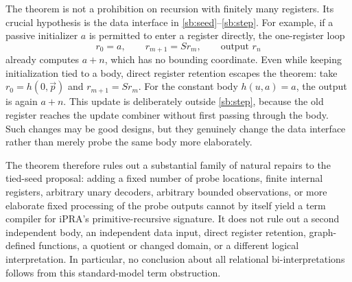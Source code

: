 The theorem is not a prohibition on recursion with finitely many
registers.  Its crucial hypothesis is the data interface in
\eqref{sb:seed}--\eqref{sb:step}.  For example, if a passive initializer
$a$ is permitted to enter a register directly, the one-register loop
\[
             r_0=a,\qquad r_{m+1}=Sr_m,
             \qquad\text{output }r_n
\]
already computes $a+n$, which has no bounding coordinate.  Even while keeping initialization tied to a body, direct register
retention escapes the theorem: take $r_0=h(0,\vec p)$ and
$r_{m+1}=Sr_m$.  For the constant body $h(u,a)=a$, the output is again
$a+n$.  This update is deliberately outside \eqref{sb:step}, because
the old register reaches the update combiner without first passing
through the body.  Such changes may be good designs, but they genuinely
change the data interface rather than merely probe the same body more
elaborately.

The theorem therefore rules out a substantial family of natural repairs
to the tied-seed proposal: adding a fixed number of probe locations,
finite internal registers, arbitrary unary decoders, arbitrary bounded
observations, or more elaborate fixed processing of the probe outputs
cannot by itself yield a term compiler for iPRA's primitive-recursive
signature.  It does not rule out a second independent body, an independent
data input, direct register retention, graph-defined functions, a quotient
or changed domain, or a different logical interpretation.  In particular,
no conclusion about all relational bi-interpretations follows from this
standard-model term obstruction.
